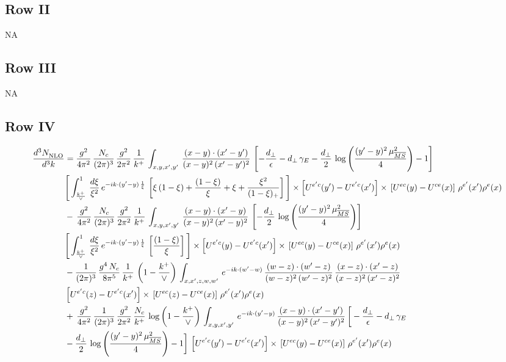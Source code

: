 \documentclass[9pt]{article}
\numberwithin{equation}{section}
\begin{document}
\subsection{Row II}
\textsc{NA}
\subsection{Row III}
\textsc{NA}
\subsection{Row IV}
\begin{align}
    \frac{d^{3}N_{\rm NLO}^{\rm}}{d^{3}k}  & =  \frac{g^{2}}{4\pi^{2}}\, \frac{N_{c}}{(2\pi)^{3}}\,\frac{g^{2}}{2\pi^{2}}\, \frac{1}{k^{+}}\,\int_{x,y,x',y'}\,\frac{(x-y)\cdot (x'-y')}{(x-y)^{2}\,(x'-y')^{2}}\,\left[-\frac{d_{\perp}}{\epsilon}-d_{\perp}\,\gamma_{E}-\frac{d_{\perp}}{2}\,\log{\left(\frac{(y'-y)^{2}\,\mu^{2}_{\overline{MS}}}{4}\right)}-1\right]\,\notag \\ & \Bigg[\int_{\frac{k^{+}}{\vee}}^{1}\,\frac{d\xi}{\xi^{2}}\,e^{-ik\cdot (y'-y)\,\frac{1}{\xi}}\,\left[\xi\,(1-\xi)+\frac{(1-\xi)}{\xi}+\xi+\frac{\xi^{2}}{(1-\xi)_{+}}\right]\Bigg]\times \left[U^{e'c}(y') - U^{e'c}(x')\right] \times\, \left[U^{ec}(y) - U^{ce}(x)\right]\, \rho^{e'}(x') \rho^{e}(x) \notag \\
&   -\,\frac{g^{2}}{4\pi^{2}}\, \frac{N_{c}}{(2\pi)^{3}}\,\frac{g^{2}}{2\pi^{2}}\, \frac{1}{k^{+}}\,\int_{x,y,x',y'}\,\frac{(x-y)\cdot (x'-y)}{(x-y)^{2}\,(x'-y)^{2}}\,\left[-\frac{d_{\perp}}{2}\,\log{\left(\frac{(y'-y)^{2}\,\mu^{2}_{\overline{MS}}}{4}\right)}\right]\,\notag \\ &  \Bigg[\int_{\frac{k^{+}}{\vee}}^{1}\,\frac{d\xi}{\xi^{2}}\,e^{-ik\cdot (y'-y)\,\frac{1}{\xi}}\,\left[\frac{(1-\xi)}{\xi}\right]\Bigg]\times \left[U^{e'c}(y) - U^{e'c}(x')\right] \times\, \left[U^{ec}(y) - U^{ce}(x)\right]\, \rho^{e'}(x') \rho^{e}(x) \notag \\
&   -\frac{1}{(2\pi)^{3}}\,\frac{g^{4}\,N_{c}}{8\pi^{5}}\,\frac{1}{k^{+}}\,\left(1-\frac{k^{+}}{\vee}\right)\,\int_{x,x',z,w,w'}\,e^{-ik\cdot (w'-w)}\,\frac{(w-z)\cdot(w'-z)}{(w-z)^{2}\,(w'-z)^{2}}\,\frac{(x-z)\cdot(x'-z)}{(x-z)^{2}\,(x'-z)^{2}}\notag \\
& \left[U^{e'c}(z) - U^{e'c}(x')\right] \times\, \left[U^{ec}(z) - U^{ce}(x)\right]\, \rho^{e'}(x') \rho^{e}(x) \notag \\
&  +\, \frac{g^{2}}{4\pi^{2}}\, \frac{1}{(2\pi)^{3}}\,\frac{g^{2}}{2\pi^{2}}\, \frac{N_{c}}{k^{+}}\,\log{\left(1-\frac{k^{+}}{\vee}\right)}\,\int_{x,y,x',y'}\,e^{-ik\cdot (y'-y)}\,\frac{(x-y)\cdot (x'-y')}{(x-y)^{2}\,(x'-y')^{2}}\,\bigg[-\frac{d_{\perp}}{\epsilon}-d_{\perp}\,\gamma_{E}\notag \\ & -\frac{d_{\perp}}{2}\,\log{\left(\frac{(y'-y)^{2}\,\mu^{2}_{\overline{MS}}}{4}\right)}-1\bigg]\,\left[U^{e'c}(y') - U^{e'c}(x')\right] \times\, \left[U^{ec}(y) - U^{ce}(x)\right]\, \rho^{e'}(x') \rho^{e}(x) \notag \\

\end{align}
\end{document}
